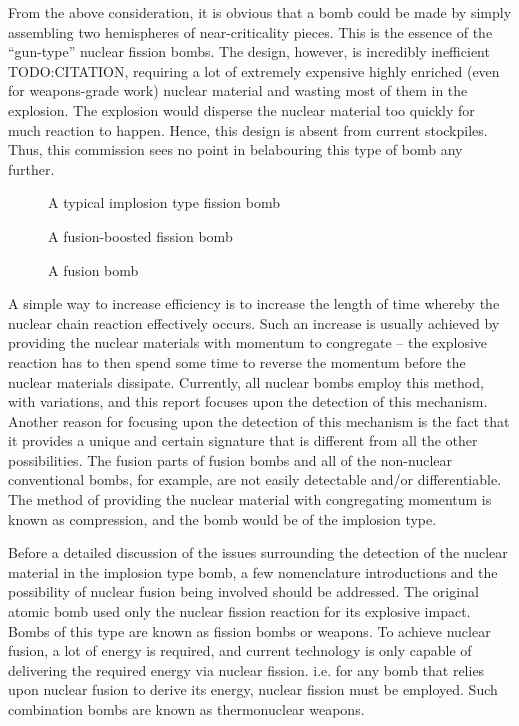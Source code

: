 \documentclass[twoside,titlepage,11pt,twocolumn,a4paper]{article}
\begin{document}
From the above consideration, it is obvious that a bomb could be made
by simply assembling two hemispheres of near-criticality pieces. This
is the essence of the ``gun-type'' nuclear fission bombs. The design,
however, is incredibly inefficient TODO:CITATION, requiring a lot of
extremely expensive highly enriched (even for weapons-grade work)
nuclear material and wasting most of them in the explosion. The
explosion would disperse the nuclear material too quickly for much
reaction to happen. Hence, this design is absent from current
stockpiles. Thus, this commission sees no point in belabouring this
type of bomb any further.

\begin{figure}
  \caption{A typical implosion type fission bomb}
\end{figure}
\begin{figure}
  \caption{A fusion-boosted fission bomb}
\end{figure}
\begin{figure}
  \caption{A fusion bomb}
\end{figure}

A simple way to increase efficiency is to increase the length of time
whereby the nuclear chain reaction effectively occurs. Such an
increase is usually achieved by providing the nuclear materials with
momentum to congregate -- the explosive reaction has to then spend
some time to reverse the momentum before the nuclear materials
dissipate. Currently, all nuclear bombs employ this method, with
variations, and this report focuses upon the detection of this
mechanism. Another reason for focusing upon the detection of this
mechanism is the fact that it provides a unique and certain signature
that is different from all the other possibilities. The fusion parts
of fusion bombs and all of the non-nuclear conventional bombs, for
example, are not easily detectable and/or differentiable. The method
of providing the nuclear material with congregating momentum is known
as compression, and the bomb would be of the implosion type.

Before a detailed discussion of the issues surrounding the detection
of the nuclear material in the implosion type bomb, a few
nomenclature introductions and the possibility of nuclear fusion being
involved should be addressed. The original atomic bomb used only the
nuclear fission reaction for its explosive impact. Bombs of this type
are known as fission bombs or weapons. To achieve nuclear fusion, a
lot of energy is required, and current technology is only capable of
delivering the required energy via nuclear fission. i.e. for any bomb
that relies upon nuclear fusion to derive its energy, nuclear fission
must be employed. Such combination bombs are known as thermonuclear
weapons.
\end{document}

